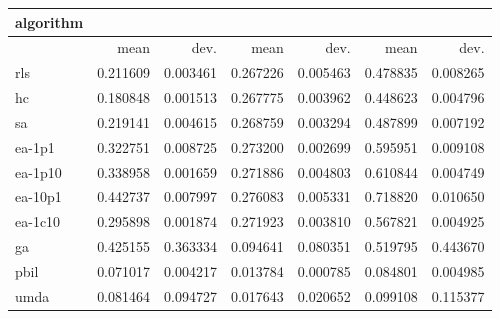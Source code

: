 \begin{tabular}{@{}l*{6}{>{{}}N{1}{2}}@{}}
\toprule
{algorithm} &  &  &  \\
\midrule
& {mean} & {dev.} & {mean} & {dev.} & {mean} & {dev.} \\
\midrule
rls & 0.211609 & 0.003461 & 0.267226 & 0.005463 & 0.478835 & 0.008265 \\
 hc & 0.180848 & 0.001513 & 0.267775 & 0.003962 & 0.448623 & 0.004796 \\
 sa & 0.219141 & 0.004615 & 0.268759 & 0.003294 & 0.487899 & 0.007192 \\
 ea-1p1 & 0.322751 & 0.008725 & 0.273200 & 0.002699 & 0.595951 & 0.009108 \\
 ea-1p10 & 0.338958 & 0.001659 & 0.271886 & 0.004803 & 0.610844 & 0.004749 \\
 ea-10p1 & 0.442737 & 0.007997 & 0.276083 & 0.005331 & 0.718820 & 0.010650 \\
 ea-1c10 & 0.295898 & 0.001874 & 0.271923 & 0.003810 & 0.567821 & 0.004925 \\
 ga & 0.425155 & 0.363334 & 0.094641 & 0.080351 & 0.519795 & 0.443670 \\
 pbil & 0.071017 & 0.004217 & 0.013784 & 0.000785 & 0.084801 & 0.004985 \\
 umda & 0.081464 & 0.094727 & 0.017643 & 0.020652 & 0.099108 & 0.115377 \\
 \bottomrule
\end{tabular}
